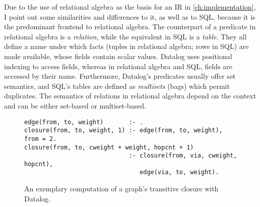 Due to the use of relational algebra as the basis for an \ac{IR}
in \ref{ch:implementation}, I point out some similarities and differences to it,
as well as to SQL, because it is the predominant frontend to relational algebra.
The counterpart of a predicate in relational algebra is a \emph{relation}, while
the equivalent in SQL is a \emph{table}.
They all define a name under which facts (tuples in relational algebra;
rows in SQL) are made available, whose fields contain scalar values.
Datalog uses positional indexing to access fields, whereas in
relational algebra and SQL, fields are accessed by their name.
Furthermore, Datalog's predicates usually offer set semantics,
and SQL's tables are defined as \emph{multisets} (bags) which permit duplicates.
The semantics of relations in relational algebra depend on the context and
can be either set-based or multiset-based.

\begin{figure}[htpb]
    \centering
    \begin{lstlisting}[keepspaces]
edge(from, to, weight)       :- .
closure(from, to, weight, 1) :- edge(from, to, weight), from = 2.
closure(from, to, cweight + weight, hopcnt + 1)
                             :- closure(from, via, cweight, hopcnt),
                                edge(via, to, weight).\end{lstlisting}
    \caption{An exemplary computation of a graph's transitive closure with Datalog.}\label{code:trans-closure-datalog}
\end{figure}

